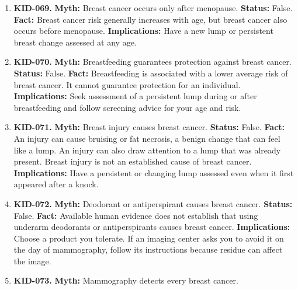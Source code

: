 \documentclass[11pt,oneside]{book}
\begin{document}
\begin{enumerate}[leftmargin=0pt,labelwidth=0pt,labelsep=0pt,itemindent=0pt]
\textbf{Implications:} Arrange an examination for a new lump. Depending on findings, imaging and sometimes a biopsy may be needed.
\item[] \textbf{KID-069.} \textbf{Myth:} Breast cancer occurs only after menopause.\newline
\textbf{Status:} False.\newline
\textbf{Fact:} Breast cancer risk generally increases with age, but breast cancer also occurs before menopause. \cite{ref363,ref311}\newline
\textbf{Implications:} Have a new lump or persistent breast change assessed at any age.
\item[] \textbf{KID-070.} \textbf{Myth:} Breastfeeding guarantees protection against breast cancer.\newline
\textbf{Status:} False.\newline
\textbf{Fact:} Breastfeeding is associated with a lower average risk of breast cancer. It cannot guarantee protection for an individual. \cite{ref364}\newline
\textbf{Implications:} Seek assessment of a persistent lump during or after breastfeeding and follow screening advice for your age and risk.
\item[] \textbf{KID-071.} \textbf{Myth:} Breast injury causes breast cancer.\newline
\textbf{Status:} False.\newline
\textbf{Fact:} An injury can cause bruising or fat necrosis, a benign change that can feel like a lump. An injury can also draw attention to a lump that was already present. Breast injury is not an established cause of breast cancer. \cite{ref365}\newline
\textbf{Implications:} Have a persistent or changing lump assessed even when it first appeared after a knock.
\item[] \textbf{KID-072.} \textbf{Myth:} Deodorant or antiperspirant causes breast cancer.\newline
\textbf{Status:} False.\newline
\textbf{Fact:} Available human evidence does not establish that using underarm deodorants or antiperspirants causes breast cancer. \cite{ref16,ref312}\newline
\textbf{Implications:} Choose a product you tolerate. If an imaging center asks you to avoid it on the day of mammography, follow its instructions because residue can affect the image.
\item[] \textbf{KID-073.} \textbf{Myth:} Mammography detects every breast cancer.\newline

\end{enumerate}
\end{document}
